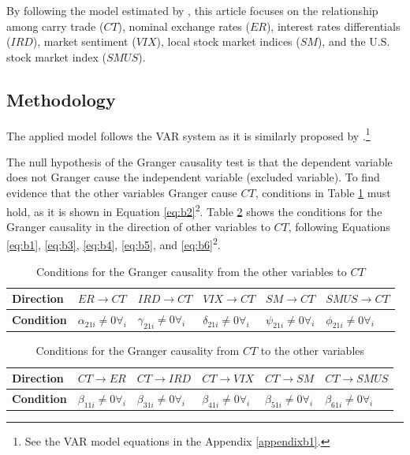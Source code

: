 \documentclass[a4paper, twoside]{templates/ociamthesis}
\begin{document}
By following the model estimated by \textcite{nishigaki2007}, this article focuses on the relationship among carry trade (\(CT\)), nominal exchange rates (\(ER\)), interest rates differentials (\(IRD\)), market sentiment (\(VIX\)), local stock market indices (\(SM\)), and the U.S. stock market index (\(SMUS\)).

\hypertarget{threetwoone}{%
\subsection{Methodology}\label{threetwoone}}

The applied model follows the VAR system as it is similarly proposed by \textcite{amiri2012}.\footnote{See the VAR model equations in the Appendix \ref{appendixb1}.}

The null hypothesis of the Granger causality test is that the dependent variable does not Granger cause the independent variable (excluded variable). To find evidence that the other variables Granger cause \(CT\), conditions in Table \ref{tab:Table31} must hold, as it is shown in Equation \eqref{eq:b2}\textsuperscript{2}. Table \ref{tab:Table32} shows the conditions for the Granger causality in the direction of other variables to \(CT\), following Equations \eqref{eq:b1}, \eqref{eq:b3}, \eqref{eq:b4}, \eqref{eq:b5}, and \eqref{eq:b6}\textsuperscript{2}.

\begin{table}[H]

\caption{\label{tab:Table31}Conditions for the Granger causality from the other variables to $CT$}
\centering
\fontsize{10}{12}\selectfont
\begin{tabular}[t]{>{}llllll}
\toprule
Direction & $ER$$\rightarrow$$CT$ & $IRD$$\rightarrow$$CT$ & $VIX$$\rightarrow$$CT$ & $SM$$\rightarrow$$CT$ & $SMUS$$\rightarrow$$CT$\\
\midrule
\textbf{Condition} & $\alpha_{21i}\neq0\forall_i$ & $\gamma_{21i}\neq0\forall_i$ & $\delta_{21i}\neq0\forall_i$ & $\psi_{21i}\neq0\forall_i$ & $\phi_{21i}\neq0\forall_i$\\
\bottomrule
\end{tabular}
\end{table}

\begin{table}[H]

\caption{\label{tab:Table32}Conditions for the Granger causality from $CT$ to the other variables}
\centering
\fontsize{10}{12}\selectfont
\begin{tabular}[t]{>{}llllll}
\toprule
Direction & $CT$$\rightarrow$$ER$ & $CT$$\rightarrow$$IRD$ & $CT$$\rightarrow$$VIX$ & $CT$$\rightarrow$$SM$ & $CT$$\rightarrow$$SMUS$\\
\midrule
\textbf{Condition} & $\beta_{11i}\neq0\forall_i$ & $\beta_{31i}\neq0\forall_i$ & $\beta_{41i}\neq0\forall_i$ & $\beta_{51i}\neq0\forall_i$ & $\beta_{61i}\neq0\forall_i$\\
\bottomrule
\end{tabular}
\end{table}
\end{document}
